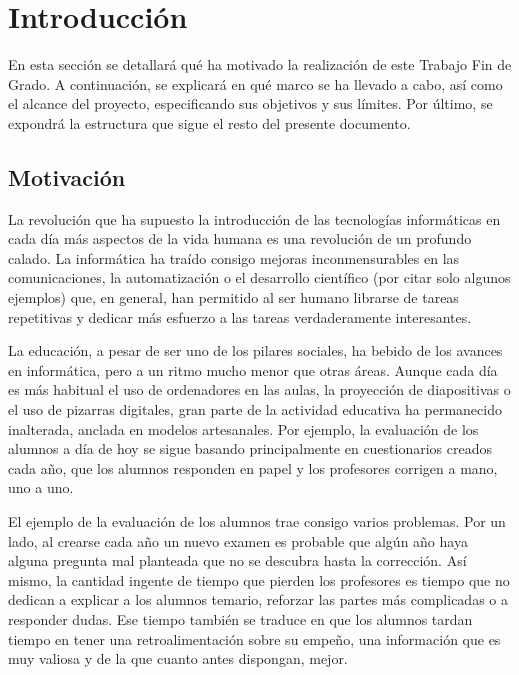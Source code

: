 \chapter{Introducción \label{sec:introduccion}}

En esta sección se detallará qué ha motivado la realización de este Trabajo Fin de Grado. A continuación, se explicará en qué marco se ha llevado a cabo, así como el alcance del proyecto, especificando sus objetivos y sus límites. Por último, se expondrá  la estructura que sigue el resto del presente documento.

\section{Motivación}


La revolución que ha supuesto la introducción de las tecnologías informáticas en cada día más aspectos de la vida humana es una revolución de un profundo calado. La informática ha traído consigo mejoras inconmensurables en las comunicaciones, la automatización o el desarrollo científico (por citar solo algunos ejemplos) que, en general, han permitido al ser humano librarse de tareas repetitivas y dedicar más esfuerzo a las tareas verdaderamente interesantes.

La educación, a pesar de ser uno de los pilares sociales, ha bebido de los avances en informática, pero a un ritmo mucho menor que otras áreas. Aunque cada día es más habitual el uso de ordenadores en las aulas, la proyección de diapositivas o el uso de pizarras digitales, gran parte de la actividad educativa ha permanecido inalterada, anclada en modelos artesanales. Por ejemplo, la evaluación de los alumnos a día de hoy se sigue basando principalmente en cuestionarios creados cada año, que los alumnos responden en papel y los profesores corrigen a mano, uno a uno.

El ejemplo de la evaluación de los alumnos trae consigo varios problemas. Por un lado, al crearse cada año un nuevo examen es probable que algún año haya alguna pregunta mal planteada que no se descubra hasta la corrección. Así mismo, la cantidad ingente de tiempo que pierden los profesores es tiempo que no dedican a explicar a los alumnos temario, reforzar las partes más complicadas o a responder dudas. Ese tiempo también se traduce en que los alumnos tardan tiempo en tener una retroalimentación sobre su empeño, una información que es muy valiosa y de la que cuanto antes dispongan, mejor.



